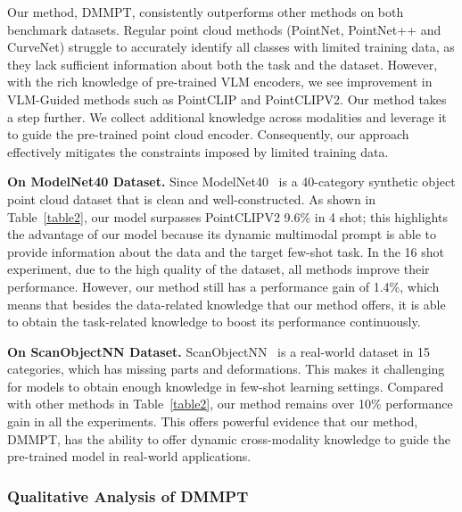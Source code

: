 \documentclass{ecai}
\begin{document}
Our method, DMMPT, consistently outperforms other methods on both benchmark datasets. Regular point cloud methods
(PointNet, PointNet++ and CurveNet)
struggle to accurately identify all classes with limited training data, as they lack sufficient information about both the task and the dataset. However, with the rich knowledge of pre-trained VLM encoders, we see improvement in VLM-Guided methods such as PointCLIP and PointCLIPV2. Our method takes a step further. We collect additional knowledge across modalities and leverage it to guide the pre-trained point cloud encoder. Consequently, our approach effectively mitigates the constraints imposed by limited training data.

\textbf{On ModelNet40 Dataset.} Since ModelNet40~\cite{wu20153d} is a 40-category synthetic object point cloud dataset that is clean and well-constructed. As shown in Table~\ref{table2}, our model surpasses PointCLIPV2 9.6\% in 4 shot; this highlights the advantage of our model because its dynamic multimodal prompt is able to provide information about the data and the target few-shot task. In the 16 shot experiment, due to the high quality of the dataset, all methods improve their performance. However, our method still has a performance gain of 1.4\%, which means that besides the data-related knowledge that our method offers, it is able to obtain the task-related knowledge to boost its performance continuously.

\textbf{On ScanObjectNN Dataset.} ScanObjectNN~\cite{uy2019revisiting} is a real-world dataset in 15 categories, which has missing parts and deformations. This makes it challenging for models to obtain enough knowledge in few-shot learning settings. Compared with other methods in Table~\ref{table2}, our method remains over 10\% performance gain in all the experiments. This offers powerful evidence that our method, DMMPT, has the ability to offer dynamic cross-modality knowledge to guide the pre-trained model in real-world applications.


\subsubsection{Qualitative Analysis of DMMPT}
\end{document}
